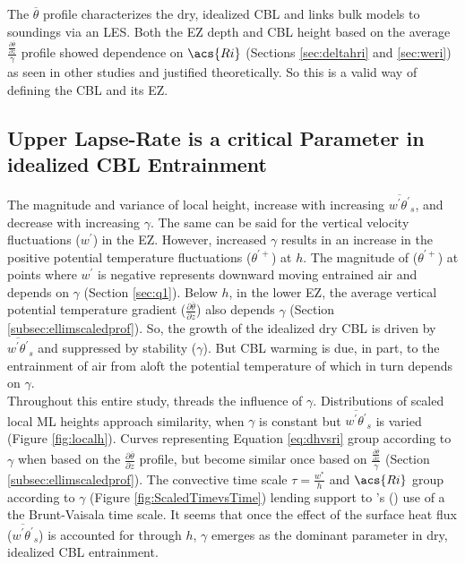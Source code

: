 The $\overline{\theta}$ profile characterizes the dry, idealized \acs{CBL} and links bulk models to soundings via an \acs{LES}.  Both the \acs{EZ} depth and \acs{CBL} height based on the average $\frac{\frac{\partial \overline{\theta}}{\partial z}}{\gamma}$ profile showed dependence on $\acs{Ri}$ (Sections \ref{sec:deltahri} and \ref{sec:weri}) as seen in other studies and justified theoretically.  So this is a valid way of defining the \acs{CBL} and its \acs{EZ}.  

\subsection{Upper Lapse-Rate is a critical Parameter in idealized \acs{CBL} Entrainment}

The magnitude and variance of local height, increase with increasing $\overline{w^{'}\theta^{'}}_{s}$, and decrease with increasing $\gamma$.  The same can be said for the vertical velocity fluctuations ($w^{'}$) in the \acs{EZ}.  However, increased $\gamma$ results in an increase in the positive potential temperature fluctuations ($\theta^{'+}$) at $h$. The magnitude of ($\theta^{'+}$) at points where $w^{'}$ is negative represents downward moving entrained air and depends on $\gamma$ (Section \ref{sec:q1}).  Below $h$, in the lower \acs{EZ}, the average vertical potential temperature gradient ($\frac{\partial \overline{\theta}}{\partial z}$) also depends $\gamma$ (Section \ref{subsec:ellimscaledprof}). So, the growth of the idealized dry \acs{CBL} is driven by $\overline{w^{'}\theta^{'}}_{s}$ and suppressed by stability ($\gamma$). But \acs{CBL} warming is due, in part, to the entrainment of air from aloft the potential temperature of which in turn depends on $\gamma$.\\

Throughout this entire study, threads the influence of $\gamma$.  Distributions of scaled local \acs{ML} heights approach similarity, when $\gamma$ is constant but $\overline{w^{'}\theta^{'}}_{s}$ is varied (Figure \ref{fig:localh}).  Curves representing Equation \ref{eq:dhvsri} group according to $\gamma$ when based on the $\frac{\partial \overline{\theta}}{\partial z}$ profile, but become similar once based on $\frac{\frac{\partial \overline{\theta}}{\partial z}}{\gamma}$ (Section \ref{subsec:ellimscaledprof}).  The convective time scale $\tau = \frac{w^{*}}{h}$ and $\acs{Ri}$ group according to $\gamma$ (Figure \ref{fig:ScaledTimevsTime}) lending support to \citeauthor{FedConzMir04}'s (\citeyear{FedConzMir04}) use of a the Brunt-Vaisala time scale.  It seems that once the effect of the surface heat flux ($\overline{w^{'}\theta^{'}}_{s}$) is accounted for through $h$, $\gamma$ emerges as the dominant parameter in dry, idealized \acs{CBL} entrainment.\\ 

